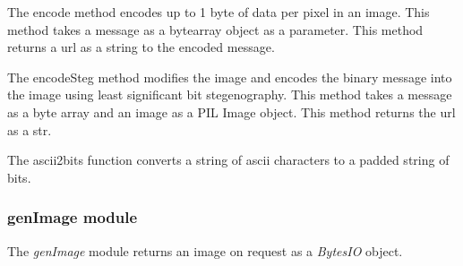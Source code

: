 \documentclass[letterpaper,12pt,openany,oneside]{sphinxmanual}
\begin{document}
\begin{fulllineitems}
\begin{fulllineitems}
\end{fulllineitems}


\begin{fulllineitems}
\label{Image_Manipulation:webStegFS.Image_Manipulation.lsbsteg.Steg.encode}
The encode method encodes up to 1 byte of data per pixel in an image.
This method takes a message as a bytearray object as a parameter.
This method returns a url as a string to the encoded message.

\end{fulllineitems}


\begin{fulllineitems}
\label{Image_Manipulation:webStegFS.Image_Manipulation.lsbsteg.Steg.encodeSteg}
The encodeSteg method modifies the image and encodes the binary
message into the image using least significant bit stegenography.
This method takes a message as a byte array and an image as a
PIL Image object.
This method returns the url as a str.

\end{fulllineitems}


\end{fulllineitems}


\begin{fulllineitems}
\label{Image_Manipulation:webStegFS.Image_Manipulation.lsbsteg.ascii2bits}
The ascii2bits function converts a string of ascii characters to a
padded string of bits.

\end{fulllineitems}



\subsubsection{genImage module}
\label{Image_Manipulation:genimage-module}\label{Image_Manipulation:module-webStegFS.Image_Manipulation.genImage}
The \emph{genImage} module returns an image on request as a \emph{BytesIO} object.
\end{document}
